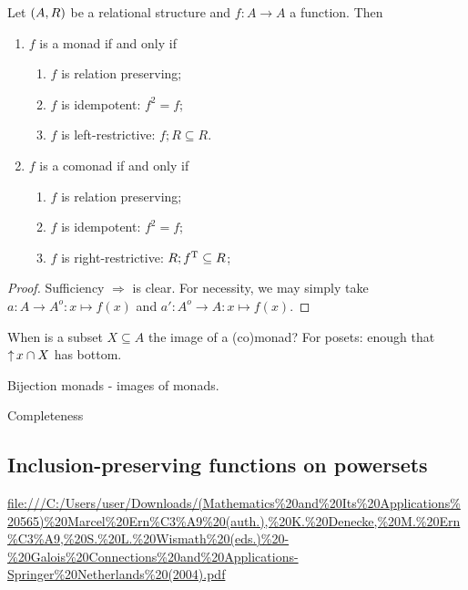 \begin{lemma}
Let $\left( A,R \right)$ be a relational structure and $f: A \to A$ a function. Then
\begin{enumerate}
\item $f$ is a monad \textup{if and only if}
\begin{enumerate}
\item $f$ is relation preserving;
\item $f$ is idempotent: $f^2 = f$;
\item $f$ is left-restrictive: $f;R \subseteq R$.
\end{enumerate}
\item $f$ is a comonad \textup{if and only if}
\begin{enumerate}
\item $f$ is relation preserving;
\item $f$ is idempotent: $f^2 = f$;
\item $f$ is right-restrictive: $R;f^{\mathrm{T}} \subseteq R$;
\end{enumerate}
\end{enumerate}
\end{lemma}
\begin{proof}
Sufficiency $\Rightarrow$ is clear. For necessity, we may simply take $a: A \to A^o: x\mapsto f(x)$ and $a': A^o \to A: x\mapsto f(x)$.
\end{proof}

\begin{proposition}
When is a subset $X\subseteq A$ the image of a (co)monad? For posets: enough that $\mathop{\uparrow} x \cap X$ has bottom.
\end{proposition}

\begin{proposition}
Bijection monads - images of monads.
\end{proposition}

\begin{definition}
Completeness
\end{definition}

\subsection{Inclusion-preserving functions on powersets}
\url{file:///C:/Users/user/Downloads/(Mathematics%20and%20Its%20Applications%20565)%20Marcel%20Ern%C3%A9%20(auth.),%20K.%20Denecke,%20M.%20Ern%C3%A9,%20S.%20L.%20Wismath%20(eds.)%20-%20Galois%20Connections%20and%20Applications-Springer%20Netherlands%20(2004).pdf}

